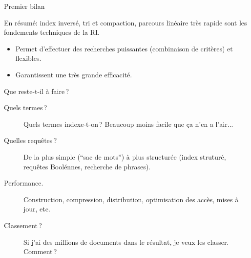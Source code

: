 \begin{frame}{Premier bilan}

En résumé: index inversé, tri et compaction, parcours linéaire très rapide sont
les fondements techniques de la RI.

\begin{itemize}
 \item Permet d'effectuer des recherches \alert{puissantes} (combinaison de critères)
     et \alert{flexibles}.
 \item \alert{Garantissent une très grande efficacité.}
\end{itemize}
\medskip

Que reste-t-il à faire\,?

\begin{description}
 \item[Quels termes\,?] Quels termes indexe-t-on\,? Beaucoup moins facile que ça n'en a l'air...
 \item[Quelles requêtes\,?] De la plus simple (``sac de mots'') à plus 
                 structurée (index struturé, requêtes Boolénnes, recherche de phrases).
   \item[Performance.] Construction, compression, distribution, optimisation des accès,  mises à jour, etc.
  \item[Classement\,?] Si j'ai des millions de documents dans le résultat, je veux les classer. Comment\,?
\end{description}


\end{frame}
